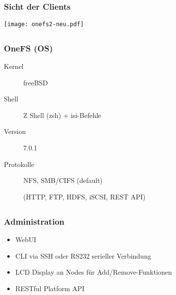 \documentclass{beamer}
\begin{document}
\subsection{}
\begin{frame}[fragile]
  \frametitle{Sicht der Clients}

  \begin{center}\texttt{[image: onefs2-neu.pdf]}\end{center}

\end{frame}  

\subsection{}
\begin{frame}[fragile]
  \frametitle{OneFS (OS)}

  \begin{description}
    \item[Kernel] freeBSD
    \item[Shell] Z Shell (zsh) + isi-Befehle
    \item[Version] 7.0.1
    \item[Protokolle] NFS, SMB/CIFS (default)
    \item[] (HTTP, FTP, HDFS, iSCSI, REST API) 

   \end{description}

\end{frame}    

\subsection{}
\begin{frame}[fragile]
  \frametitle{Administration}

  \begin{itemize}
    \item WebUI
    \item CLI via SSH oder RS232 serieller Verbindung
    \item LCD Display an Nodes für Add/Remove-Funktionen
    \item RESTful Platform API
  \end{itemize}

\end{frame}  
\end{document}

